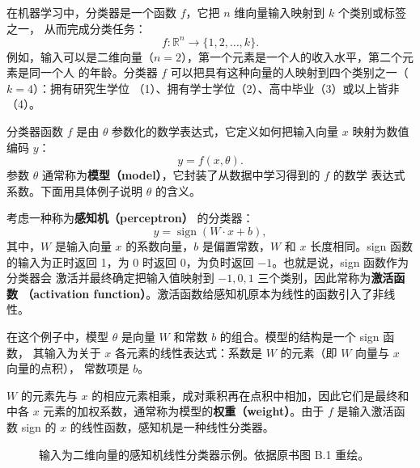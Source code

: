 在机器学习中，分类器是一个函数 $f$，它把 $n$ 维向量输入映射到 $k$ 个类别或标签之一，
从而完成分类任务：
\begin{equation}
  f:\mathbb{R}^n\rightarrow\{1,2,\ldots,k\}.
  \label{eq:appb-1}
\end{equation}
例如，输入可以是二维向量（$n=2$），第一个元素是一个人的收入水平，第二个元素是同一个人
的年龄。分类器 $f$ 可以把具有这种向量的人映射到四个类别之一（$k=4$）：拥有研究生学位
（1）、拥有学士学位（2）、高中毕业（3）或以上皆非（4）。

分类器函数 $f$ 是由 $\theta$ 参数化的数学表达式，它定义如何把输入向量 $x$ 映射为数值
编码 $y$：
\begin{equation}
  y=f(x,\theta).
  \label{eq:appb-2}
\end{equation}
参数 $\theta$ 通常称为\textbf{模型（model）}，它封装了从数据中学习得到的 $f$ 的数学
表达式系数。下面用具体例子说明 $\theta$ 的含义。

考虑一种称为\textbf{感知机（perceptron）}\cite{appb-rosenblatt} 的分类器：
\begin{equation}
  y=\operatorname{sign}(W\cdot x+b),
  \label{eq:appb-3}
\end{equation}
其中，$W$ 是输入向量 $x$ 的系数向量，$b$ 是偏置常数，$W$ 和 $x$ 长度相同。sign 函数
的输入为正时返回 1，为 0 时返回 0，为负时返回 $-1$。也就是说，sign 函数作为分类器会
激活并最终确定把输入值映射到 $-1,0,1$ 三个类别，因此常称为\textbf{激活函数
（activation function）}。激活函数给感知机原本为线性的函数引入了非线性。

在这个例子中，模型 $\theta$ 是向量 $W$ 和常数 $b$ 的组合。模型的结构是一个 sign 函数，
其输入为关于 $x$ 各元素的线性表达式：系数是 $W$ 的元素（即 $W$ 向量与 $x$ 向量的点积），
常数项是 $b$。

$W$ 的元素先与 $x$ 的相应元素相乘，成对乘积再在点积中相加，因此它们是最终和中各 $x$
元素的加权系数，通常称为模型的\textbf{权重（weight）}。由于 $f$ 是输入激活函数 sign
的 $x$ 的线性函数，感知机是一种线性分类器。

\begin{figure}[htbp]
  \centering
  \caption{输入为二维向量的感知机线性分类器示例。依据原书图 B.1 重绘。}
  \label{fig:b-1}
\end{figure}

